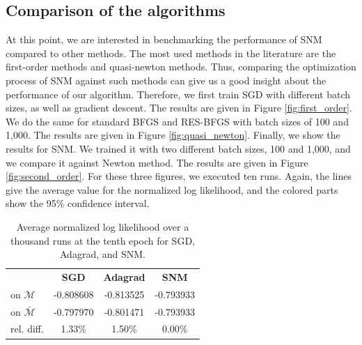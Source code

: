 \documentclass[conference]{IEEEtran}
\begin{document}
\subsection{Comparison of the algorithms}
\label{sec:comp_algo}

At this point, we are interested in benchmarking the performance of SNM compared to other methods. The most used methods in the literature are the first-order methods and quasi-newton methods. Thus, comparing the optimization process of SNM against such methods can give us a good insight about the performance of our algorithm. Therefore, we first train SGD with different batch sizes, as well as gradient descent. The results are given in Figure \ref{fig:first_order}. We do the same for standard BFGS and RES-BFGS with batch sizes of 100 and 1,000. The results are given in Figure \ref{fig:quasi_newton}. Finally, we show the results for SNM. We trained it with two different batch sizes, 100 and 1,000, and we compare it against Newton method. The results are given in Figure \ref{fig:second_order}. For these three figures, we executed ten runs. Again, the lines give the average value for the normalized log likelihood, and the colored parts show the 95\% confidence interval.

\begin{table}[b]
\vspace{-0.5cm}
\centering
\renewcommand\arraystretch{1.2}
\begin{tabular}{l|ccc}
\multicolumn{1}{l}{} & {\bf SGD} & {\bf Adagrad} & {\bf SNM} \\ \cline{2-4}
on $\mathcal{M}$ & -0.808608 & -0.813525 & -0.793933 \\
on $\bar{\mathcal{M}}$ & -0.797970 & -0.801471
 & -0.793933 \\ \hline
rel. diff. & 1.33\% & 1.50\% & 0.00\%
\end{tabular}
\caption{\label{tab:res_norm_unorm} Average normalized log likelihood over a thousand runs at the tenth epoch for SGD, Adagrad, and SNM.}
\end{table}
\end{document}
